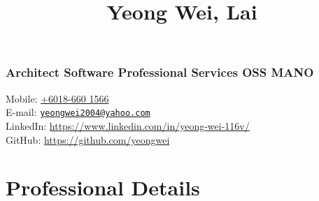 \documentclass[
]{article}
\title{Yeong Wei, Lai}
\author{}
\date{\vspace{-2.5em}}
\begin{document}
\maketitle

\hypertarget{architect-software-professional-services-oss-mano}{%
\subsubsection{Architect \textbar{} Software Professional Services
\textbar{} OSS \textbar{}
MANO}\label{architect-software-professional-services-oss-mano}}

Mobile: \href{https://wa.me/186601566}{+6018-660 1566}\\
E-mail:
\href{mailto:yeongwei2004@yahoo.com}{\nolinkurl{yeongwei2004@yahoo.com}}\\
LinkedIn: \url{https://www.linkedin.com/in/yeong-wei-116v/}\\
GitHub: \url{https://github.com/yeongwei}

\hypertarget{professional-details}{%
\section{Professional Details}\label{professional-details}}
\end{document}
